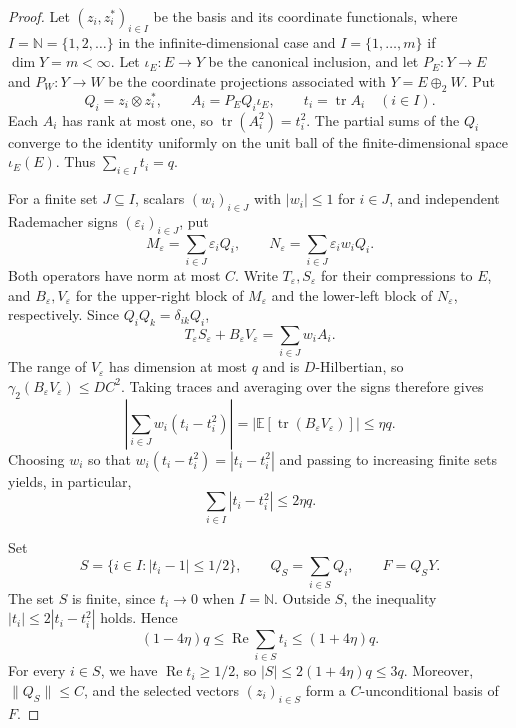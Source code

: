 \documentclass[11pt,a4paper,reqno]{amsart}
\theoremstyle{definition}
\newcommand{\norm}[1]{\lVert #1\rVert}
\DeclareMathOperator{\tr}{tr}
\numberwithin{equation}{section}
\begin{document}
\begin{proof}
Let $(z_i,z_i^*)_{i\in I}$ be the basis and its coordinate functionals, where $I=\mathbb N=\{1,2,\ldots\}$ in the infinite-dimensional case and $I=\{1,\ldots,m\}$ if $\dim Y=m<\infty$. Let $\iota_E\colon E\to Y$ be the canonical inclusion, and let $P_E\colon Y\to E$ and $P_W\colon Y\to W$ be the coordinate projections associated with $Y=E\oplus_2W$. Put
\begin{equation*}
    Q_i=z_i\otimes z_i^*,\qquad
    A_i=P_EQ_i\iota_E,\qquad t_i=\tr A_i\quad(i\in I).
\end{equation*}
Each $A_i$ has rank at most one, so $\tr(A_i^2)=t_i^2$. The partial sums of the $Q_i$ converge to the identity uniformly on the unit ball of the finite-dimensional space $\iota_E(E)$. Thus $\sum_{i\in I}t_i=q$.

For a finite set $J\subseteq I$, scalars $(w_i)_{i\in J}$ with $|w_i|\leq1$ for $i\in J$, and independent Rademacher signs $(\varepsilon_i)_{i\in J}$, put
\begin{equation*}
 M_\varepsilon=\sum_{i\in J}\varepsilon_iQ_i,
 \qquad
 N_\varepsilon=\sum_{i\in J}\varepsilon_iw_iQ_i.
\end{equation*}
Both operators have norm at most $C$. Write $T_\varepsilon,S_\varepsilon$ for their compressions to $E$, and $B_\varepsilon,V_\varepsilon$ for the upper-right block of $M_\varepsilon$ and the lower-left block of $N_\varepsilon$, respectively. Since $Q_iQ_k=\delta_{ik}Q_i$,
\begin{equation*}
 T_\varepsilon S_\varepsilon+B_\varepsilon V_\varepsilon
   =\sum_{i\in J}w_iA_i.
\end{equation*}
The range of $V_\varepsilon$ has dimension at most $q$ and is $D$-Hilbertian, so $\gamma_2(B_\varepsilon V_\varepsilon)\leq DC^2$. Taking traces and averaging over the signs therefore gives
\begin{equation*}
 \left|\sum_{i\in J}w_i(t_i-t_i^2)\right|
 =\left|\mathbb E[\tr(B_\varepsilon V_\varepsilon)]\right|
 \leq\eta q.
\end{equation*}
Choosing $w_i$ so that $w_i(t_i-t_i^2)=|t_i-t_i^2|$ and passing to increasing finite sets yields, in particular,
\begin{equation}\label{eq:trace-defect-bound}
    \sum_{i\in I}|t_i-t_i^2|\leq2\eta q.
\end{equation}

Set
\begin{equation*}
    S=\{i\in I:|t_i-1|\leq1/2\},\qquad
    Q_S=\sum_{i\in S}Q_i,\qquad F=Q_SY.
\end{equation*}
The set $S$ is finite, since $t_i\to0$ when $I=\mathbb N$. Outside $S$, the inequality $|t_i|\leq2|t_i-t_i^2|$ holds. Hence
\begin{equation}\label{eq:selected-trace}
    (1-4\eta)q\leq\operatorname{Re}\sum_{i\in S}t_i\leq(1+4\eta)q.
\end{equation}
For every $i\in S$, we have $\operatorname{Re}t_i\geq1/2$, so $|S|\leq2(1+4\eta)q\leq3q$. Moreover, $\norm{Q_S}\leq C$, and the selected vectors $(z_i)_{i\in S}$ form a $C$-unconditional basis of $F$.


\end{proof}
\end{document}
